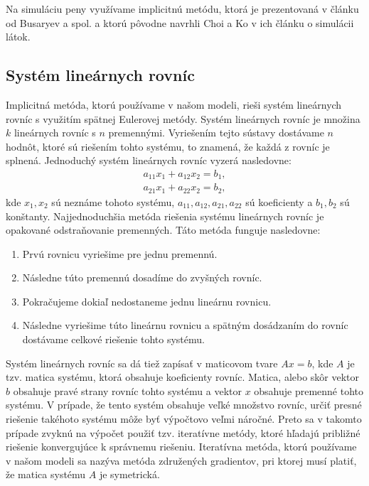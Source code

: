 Na simuláciu peny využívame implicitnú metódu, ktorá je prezentovaná v článku od Busaryev a spol. \cite{busaryev2012} a ktorú pôvodne navrhli Choi a Ko \cite{choiko2002} v ich článku o simulácii látok.

\subsection*{Systém lineárnych rovníc}

Implicitná metóda, ktorú používame v našom modeli, rieši systém lineárnych rovníc s využitím spätnej Eulerovej metódy. Systém lineárnych rovníc je množina $k$ lineárnych rovníc s $n$ premennými. Vyriešením tejto sústavy dostávame $n$ hodnôt, ktoré sú riešením tohto systému, to znamená, že každá z rovníc je splnená. Jednoduchý systém lineárnych rovníc vyzerá nasledovne:\begin{equation}
\begin{split}
	a_{11}x_{1} + a_{12}x_{2} = b_{1}, \\
	a_{21}x_{1} + a_{22}x_{2} = b_{2},
\end{split}
\end{equation}
kde $x_{1}, x_{2}$ sú neznáme tohoto systému, $a_{11}, a_{12}, a_{21}, a_{22}$ sú koeficienty a $b_{1}, b_{2}$ sú konštanty. Najjednoduchšia metóda riešenia systému lineárnych rovníc je opakované odstraňovanie premenných. Táto metóda funguje nasledovne:
\begin{enumerate}
	\item Prvú rovnicu vyriešime pre jednu premennú.
	\item Následne túto premennú dosadíme do zvyšných rovníc.
	\item Pokračujeme dokiaľ nedostaneme jednu lineárnu rovnicu.
	\item Následne vyriešime túto lineárnu rovnicu a spätným dosádzaním do rovníc dostávame celkové riešenie tohto systému.
\end{enumerate} 

Systém lineárnych rovníc sa dá tiež zapísať v maticovom tvare $Ax = b$, kde $A$ je tzv. matica systému, ktorá obsahuje koeficienty rovníc. Matica, alebo skôr vektor $b$ obsahuje pravé strany rovníc tohto systému a vektor $x$ obsahuje premenné tohto systému. V prípade, že tento systém obsahuje veľké množstvo rovníc, určiť presné riešenie takéhoto systému môže byť výpočtovo veľmi náročné. Preto sa v takomto prípade zvyknú na výpočet použiť tzv. iteratívne metódy, ktoré hľadajú približné riešenie konvergujúce k správnemu riešeniu. Iteratívna metóda, ktorú používame v našom modeli sa nazýva metóda združených gradientov, pri ktorej musí platiť, že matica systému $A$ je symetrická.

